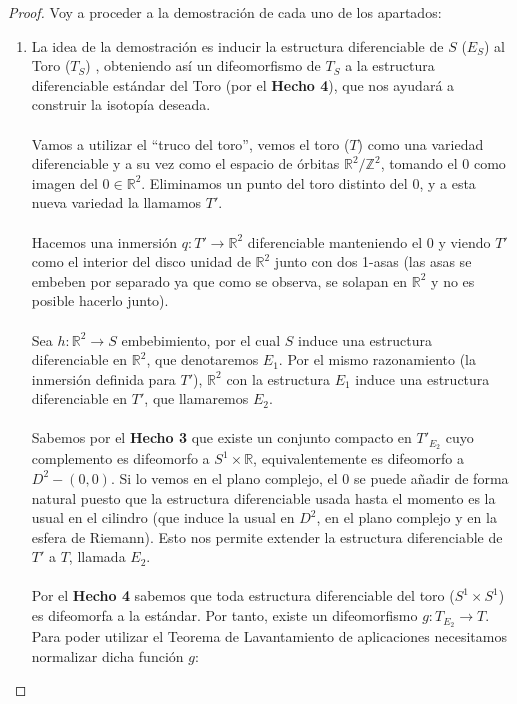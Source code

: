	\begin{proof}
		Voy a proceder a la demostración de cada uno de los apartados: \\
		\begin{enumerate}
			\item La idea de la demostración es inducir la estructura diferenciable de $S$ ($E_S$) al Toro ($T_S$) , obteniendo así un difeomorfismo de $T_S$ a la estructura diferenciable estándar del Toro (por el \textbf{Hecho 4}), que nos ayudará a construir la isotopía deseada.\\
				\\ Vamos a utilizar el ``truco del toro'', vemos el toro ($T$) como una variedad diferenciable y a su vez como el espacio de órbitas $\mathbb{R}^2/\mathbb{Z}^2$, tomando el $0$ como imagen del $0\in \mathbb{R}^2$. Eliminamos un punto del toro distinto del $0$, y a esta nueva variedad la llamamos $T'$. \\
				\\ Hacemos una inmersión $q: T' \rightarrow \mathbb{R}^2$ diferenciable manteniendo el $0$ y viendo $T'$ como el interior del disco unidad de $\mathbb{R}^2$ junto con dos 1-asas (las asas se embeben por separado ya que como se observa, se solapan en $\mathbb{R}^2$ y no es posible hacerlo junto).\\
				\\ Sea $h:\mathbb{R}^2 \rightarrow S$ embebimiento, por el cual $S$ induce una estructura diferenciable en $\mathbb{R}^2$, que denotaremos $E_1$. Por el mismo razonamiento (la inmersión definida para $T'$), $\mathbb{R}^2$ con la estructura $E_1$ induce una estructura diferenciable en $T'$, que llamaremos $E_2$.\\
				\\ Sabemos por el \textbf{Hecho 3} que existe un conjunto compacto en $T'_{E_2}$ cuyo complemento es difeomorfo a $S^1\times \mathbb{R}$, equivalentemente es difeomorfo a $D^2 - {(0,0)}$. Si lo vemos en el plano complejo, el $0$ se puede añadir de forma natural puesto que la estructura diferenciable usada hasta el momento es la usual en el cilindro (que induce la usual en $D^2$, en el plano complejo y en la esfera de Riemann). Esto nos permite extender la estructura diferenciable de $T'$ a $T$, llamada $E_2$.\\
				\\ Por el \textbf{Hecho 4} sabemos que toda estructura diferenciable del toro ($S^1\times S^1$) es difeomorfa a la estándar. Por tanto, existe un difeomorfismo $g: T_{E_2} \rightarrow T$. Para poder utilizar el Teorema de Lavantamiento de aplicaciones necesitamos normalizar dicha función $g$:

\end{enumerate}
\end{proof}
